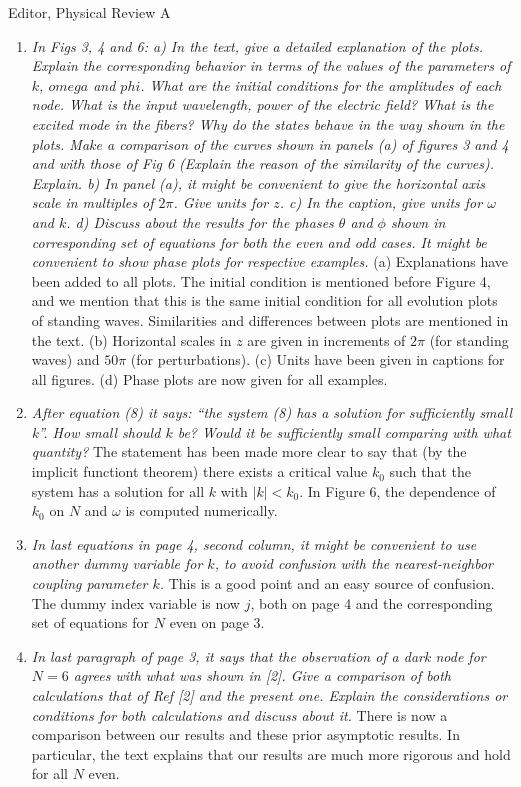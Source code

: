 \documentclass[11pt]{letter}
\begin{document}
\begin{letter}{Editor, Physical Review A}
\begin{enumerate}
\item \emph{In Figs 3, 4 and 6: a) In the text, give a detailed explanation of the plots. Explain the corresponding behavior in terms of the values of the parameters of $k$, $omega$ and $phi$. What are the initial conditions for the amplitudes of each node. What is the input wavelength, power of the electric field? What is the excited mode in the fibers? Why do the states behave in the way shown in the plots.  Make a comparison of the curves shown in panels (a) of figures 3 and 4 and with those of Fig 6 (Explain the reason of the similarity of the curves). Explain. b) In panel (a), it might be convenient to give the horizontal axis scale in multiples of $2\pi$. Give units for $z$. c) In the caption, give units for $\omega$ and $k$. d) Discuss about the results for the phases $\theta$ and $\phi$ shown in corresponding set of equations for both the even and odd cases. It might be convenient to show phase plots for respective examples.} (a) Explanations have been added to all plots. The initial condition is mentioned before Figure 4, and we mention that this is the same initial condition for all evolution plots of standing waves. Similarities and differences between plots are mentioned in the text. (b) Horizontal scales in $z$ are given in increments of $2 \pi$ (for standing waves) and $50 \pi$ (for perturbations). (c) Units have been given in captions for all figures. (d) Phase plots are now given for all examples.

\item \emph{After equation (8) it says: ``the system (8) has a solution for sufficiently small k''. How small should $k$ be? Would it be sufficiently small comparing with what quantity?} The statement has been made more clear to say that (by the implicit functiont theorem) there exists a critical value $k_0$ such that the system has a solution for all $k$ with $|k| < k_0$. In Figure 6, the dependence of $k_0$ on $N$ and $\omega$ is computed numerically.

\item \emph{In last equations in page 4, second column, it might be convenient to use another dummy variable for $k$, to avoid confusion with the nearest-neighbor coupling parameter $k$.} This is a good point and an easy source of confusion. The dummy index variable is now $j$, both on page 4 and the corresponding set of equations for $N$ even on page 3.

\item \emph{In last paragraph of page 3, it says that the observation of a dark node for $N=6$ agrees with what was shown in [2]. Give a comparison of both calculations that of Ref [2] and the present one. Explain the considerations or conditions for both calculations and discuss about it.} There is now a comparison between our results and these prior asymptotic results. In particular, the text explains that our results are much more rigorous and hold for all $N$ even.


\end{enumerate}
\end{letter}
\end{document}
